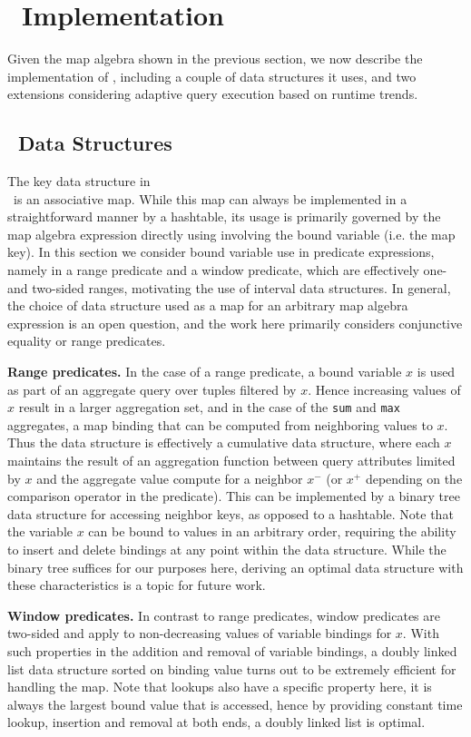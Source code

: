 \section{\compiler\ Implementation}
Given the map algebra shown in the previous section, we now describe
the implementation of \compiler, including a couple of data structures it
uses, and two extensions considering adaptive query execution based on runtime
trends.

\subsection{\compiler\ Data Structures}
The key data structure in\\\compiler\ is an
associative map.
While this map can
always be implemented in a straightforward manner by a hashtable, its usage is
primarily governed by the map algebra expression directly using involving the
bound variable (i.e. the map key). In this section we consider bound
variable use in predicate expressions, namely in a range predicate and a window
predicate, which are effectively one- and two-sided ranges, motivating the use
of interval data structures. In general, the choice of data structure used as a
map for an arbitrary map algebra expression is an open question, and the work
here primarily considers conjunctive equality or range predicates.

\textbf{Range predicates.}
In the case of a range predicate, a bound variable $x$ is used as part of an
aggregate query over tuples filtered by $x$. Hence increasing values of $x$
result in a larger aggregation set, and in the case of the \texttt{sum} and
\texttt{max} aggregates, a map binding that can be computed from neighboring
values to $x$. Thus the data structure is effectively a cumulative data
structure, where each $x$ maintains the result of an aggregation function between
query attributes limited by $x$ and the aggregate value compute for a neighbor
$x^-$ (or $x^+$ depending on the comparison operator in the predicate). This can
be implemented by a binary tree data structure for accessing neighbor keys, as
opposed to a hashtable. Note that the variable $x$ can be bound to values in an
arbitrary order, requiring the ability to insert and delete bindings at any point
within the data structure. While the binary tree suffices for our purposes here,
deriving an optimal data structure with these characteristics is a topic for
future work.

\textbf{Window predicates.}
In contrast to range predicates, window predicates are two-sided and apply to
non-decreasing values of variable bindings for $x$. With such properties in the
addition and removal of variable bindings, a doubly linked list data structure
sorted on binding value turns out to be extremely efficient for handling the map. Note
that lookups also have a specific property here, it is always the largest bound
value that is accessed, hence by providing constant time lookup, insertion and
removal at both ends, a doubly linked list is optimal.


